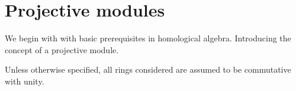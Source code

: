 \documentclass[12pt]{report}
\numberwithin{equation}{section}
\newcommand{\Hom}{{\mathrm{Hom}}}
\newcounter{dummy} \numberwithin{dummy}{section}
\newtheorem{example}[dummy]{Example}
\begin{document}
	\chapter{Projective modules}
	
	
	We begin with with basic prerequisites in homological algebra. Introducing the concept of a projective module.
	
	Unless otherwise specified, all rings considered are assumed to be commutative with unity.
%	
%	
%	
\end{document}
